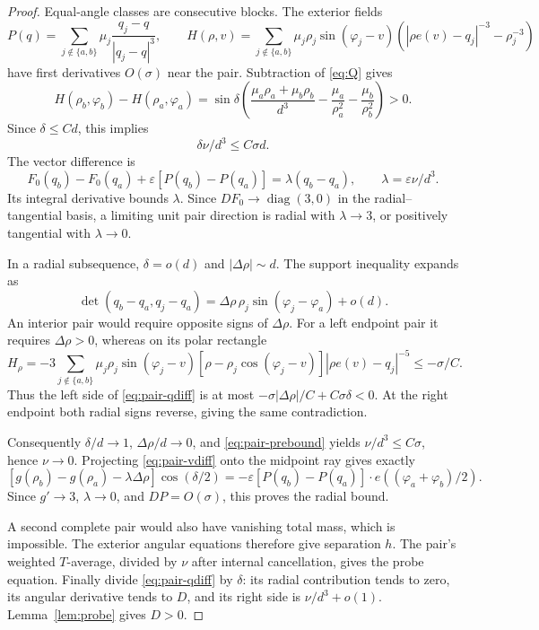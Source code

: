 \documentclass[11pt,a4paper]{article}
\numberwithin{equation}{section}
\theoremstyle{remark}
\newcommand{\eps}{\varepsilon}
\newcommand{\diag}{\operatorname{diag}}
\begin{document}
\begin{proof}
Equal-angle classes are consecutive blocks. The exterior fields
\[
 P(q)=\sum_{j\notin\{a,b\}}\mu_j\frac{q_j-q}{|q_j-q|^3},\qquad
 H(\rho,v)=\sum_{j\notin\{a,b\}}\mu_j\rho_j\sin(\varphi_j-v)
 (|\rho e(v)-q_j|^{-3}-\rho_j^{-3})
\]
have first derivatives $O(\sigma)$ near the pair. Subtraction of \eqref{eq:Q} gives
\begin{equation}\label{eq:pair-qdiff}
 H(\rho_b,\varphi_b)-H(\rho_a,\varphi_a)
 =\sin\delta\left(\frac{\mu_a\rho_a+\mu_b\rho_b}{d^3}
 -\frac{\mu_a}{\rho_a^2}-\frac{\mu_b}{\rho_b^2}\right)>0.
\end{equation}
Since $\delta\le Cd$, this implies
\begin{equation}\label{eq:pair-prebound}
 \delta\nu/d^3\le C\sigma d.
\end{equation}
The vector difference is
\begin{equation}\label{eq:pair-vdiff}
 F_0(q_b)-F_0(q_a)+\eps[P(q_b)-P(q_a)]=\lambda(q_b-q_a),
 \qquad \lambda=\eps\nu/d^3.
\end{equation}
Its integral derivative bounds $\lambda$. Since $DF_0\to\diag(3,0)$ in the radial--tangential basis, a limiting unit pair direction is radial with $\lambda\to3$, or positively tangential with $\lambda\to0$.

In a radial subsequence, $\delta=o(d)$ and $|\Delta\rho|\sim d$. The support inequality expands as
\[
 \det(q_b-q_a,q_j-q_a)=\Delta\rho\,\rho_j\sin(\varphi_j-\varphi_a)+o(d).
\]
An interior pair would require opposite signs of $\Delta\rho$. For a left endpoint pair it requires $\Delta\rho>0$, whereas on its polar rectangle
\[
 H_\rho=-3\sum_{j\notin\{a,b\}}\mu_j\rho_j\sin(\varphi_j-v)
 [\rho-\rho_j\cos(\varphi_j-v)]|\rho e(v)-q_j|^{-5}\le-\sigma/C.
\]
Thus the left side of \eqref{eq:pair-qdiff} is at most $-\sigma|\Delta\rho|/C+C\sigma\delta<0$. At the right endpoint both radial signs reverse, giving the same contradiction.

Consequently $\delta/d\to1$, $\Delta\rho/d\to0$, and \eqref{eq:pair-prebound} yields $\nu/d^3\le C\sigma$, hence $\nu\to0$. Projecting \eqref{eq:pair-vdiff} onto the midpoint ray gives exactly
\begin{equation}\label{eq:midpoint}
 [g(\rho_b)-g(\rho_a)-\lambda\Delta\rho]\cos(\delta/2)
 =-\eps[P(q_b)-P(q_a)]\cdot e((\varphi_a+\varphi_b)/2).
\end{equation}
Since $g'\to3$, $\lambda\to0$, and $DP=O(\sigma)$, this proves the radial bound.

A second complete pair would also have vanishing total mass, which is impossible. The exterior angular equations therefore give separation $h$. The pair's weighted $T$-average, divided by $\nu$ after internal cancellation, gives the probe equation. Finally divide \eqref{eq:pair-qdiff} by $\delta$: its radial contribution tends to zero, its angular derivative tends to $D$, and its right side is $\nu/d^3+o(1)$. Lemma~\ref{lem:probe} gives $D>0$.
\end{proof}
\end{document}
